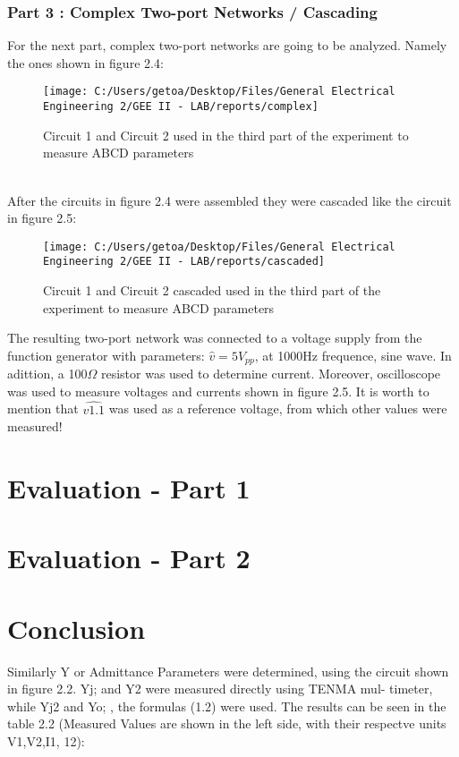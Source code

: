 \documentclass[12pt]{report}
\begin{document}
\subsection {Part 3 : Complex Two-port Networks / Cascading } 
For the next part, complex two-port networks are going to be analyzed. Namely the ones shown in figure 2.4:
\begin{figure}[ht!]
  \centering
  \texttt{[image: C:/Users/getoa/Desktop/Files/General Electrical Engineering 2/GEE II - LAB/reports/complex]}
  \caption{Circuit 1 and Circuit 2 used in the third part of the experiment to measure ABCD parameters}
\end{figure} \\
After the circuits in figure 2.4 were assembled they were cascaded like the circuit in figure 2.5: 
\begin{figure}[ht!]
  \centering
  \texttt{[image: C:/Users/getoa/Desktop/Files/General Electrical Engineering 2/GEE II - LAB/reports/cascaded]}
  \caption{Circuit 1 and Circuit 2 cascaded used in the third part of the experiment to measure ABCD parameters}
\end{figure} 
\newpage
The resulting two-port network was connected to a voltage supply from the function generator with parameters: $\hat{v} = 5V_{pp}$, at 1000Hz frequence, sine wave. In adittion, a 100$\Omega$ resistor was used to determine current. Moreover, oscilloscope was used to measure voltages and currents shown in figure 2.5.  It is worth to mention that $\hat{v1.1}$ was used as a reference voltage, from which other values were measured!
\chapter {Evaluation - Part 1}


\chapter {Evaluation - Part 2 }

\chapter{Conclusion}



    Similarly Y or Admittance Parameters were determined, using the circuit  shown in figure 2.2. Yj; and Y2 were measured directly using TENMA mul-  timeter, while Yj2 and Yo; , the formulas (1.2) were used. The results can be  seen in the table 2.2 (Measured Values are shown in the left side, with their  respectve units V1,V2,I1, 12): 
\end{document}
